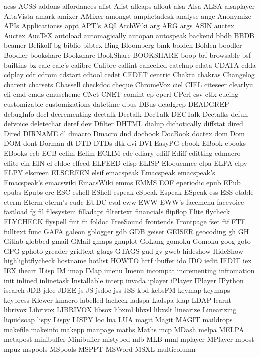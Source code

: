 acss
ACSS
addons
affordances
alist
Alist
allcaps
allout
alsa
Alsa
ALSA
alsaplayer
AltaVista
amark
amixer
AMixer
amongst
amphetadesk
analyse
ange
Anonymize
APIs
Applicationss
appt
APT's
AQI
ArchWiki
arg
ARG
args
ASIN
auctex
Auctex
AucTeX
autoload
automagically
autopan
autospeak
backend
bbdb
BBDB
beamer
Belikoff
bg
biblio
bibtex
Bing
Bloomberg
bmk
bolden
Bolden
boodler
Boodler
bookshare
Bookshare
BookShare
BOOKSHARE
boop
brf
browsable
bsf
builtins
bz
calc
calc's
calibre
Calibre
callint
cancelled
catchup
cdata
CDATA
cdda
cdplay
cdr
cdrom
cdstart
cdtool
cedet
CEDET
centric
Chakra
chakras
Changelog
charent
charsets
Chassell
checkdoc
cheque
ChromeVox
ciel
CIEL
citeseer
clearlyu
cli
cmd
cmds
cmuscheme
CNet
CNET
comint
cp
cperl
CPerl
csv
ctlx
cueing
customizable
customizations
datetime
dbus
DBus
deadgrep
DEADGREP
debugInfo
decl
decrementing
dectalk
Dectalk
DecTalk
DECTalk
Dectalks
defun
defvoice
deletechar
deref
dev
Dfilter
DHTML
dialup
dichotically
diffstat
dired
Dired
DIRNAME
dl
dmacro
Dmacro
dnd
docbook
DocBook
doctex
dom
Dom
DOM
dont
Dorman
dt
DTD
DTDs
dtk
dvi
DVI
EasyPG
ebook
EBook
ebooks
EBooks
ecb
ECB
eclim
Eclim
ECLIM
ede
ediary
ediff
Ediff
editting
edmacro
eflite
ein
EIN
el
eldoc
elfeed
ELFEED
elisp
ELISP
Eloquennce
elpa
ELPA
elpy
ELPY
elscreen
ELSCREEN
elsif
emacspeak
Emacspeak
emacspeak's
Emacspeak's
emacswiki
EmacsWiki
emms
EMMS
EOF
eperiodic
epub
EPub
epubs
Epubs
erc
ESC
eshell
EShell
espeak
eSpeak
Espeak
ESpeak
ess
ESS
etable
eterm
Eterm
eterm's
eudc
EUDC
eval
eww
EWW
EWW's
facemenu
facevoice
fastload
fg
fil
filesystem
filladapt
filtertext
financials
flipflop
Flite
flycheck
FLYCHECK
flyspell
fmt
fn
foldoc
FreeSound
frontends
Frontpage
fset
ftf
FTF
fulltext
func
GAFA
galeon
gblogger
gdb
GDB
geiser
GEISER
geocoding
gh
GH
Gitlab
globbed
gmail
GMail
gmaps
gnuplot
GoLang
gomoku
Gomoku
goog
goto
GPG
gphoto
greader
gridtext
gtags
GTAGS
gud
gv
gweb
hideshow
HideShow
highlightflycheck
hostname
hotlist
HOWTO
hrtf
ibuffer
ido
IDO
iedit
IEDIT
iex
IEX
iheart
ILisp
IM
imap
IMap
imenu
Imenu
incompat
incrementing
infromation
init
inlined
inlinetask
Installable
interp
invada
iplayer
iPlayer
IPlayer
IPython
isearch
JDB
jdee
JDEE
js
JS
jsdoc
jss
JSS
kbd
kcbsFM
keymap
keymaps
keypress
Klewer
kmacro
labelled
lacheck
ladspa
Ladspa
ldap
LDAP
learnt
librivox
Librivox
LIBRIVOX
libsox
libxml
libxsl
libxslt
linearize
Linearizing
liquidsoap
lispy
Lispy
LISPY
loc
lua
LUA
magit
Magit
MAGIT
maildrops
makefile
makeinfo
makepp
manpage
maths
Maths
mcp
MDash
melpa
MELPA
metapost
minibuffer
Minibuffer
mistyped
mlb
MLB
mml
mplayer
MPlayer
mpost
mpuz
mspools
MSpools
MSPPT
MSWord
MSXL
multicolumn
